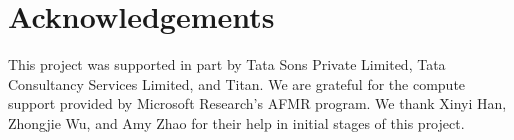 \section*{Acknowledgements}
This project was supported in part by Tata Sons Private Limited, Tata Consultancy Services Limited, and Titan.
We are grateful for the compute support provided by Microsoft Research's AFMR program.
We thank Xinyi Han, Zhongjie Wu, and Amy Zhao for their help in initial stages of this project. 
